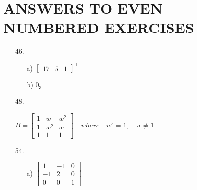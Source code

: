 \documentclass[11pt]{amsbook}
\begin{document}

\section*{ANSWERS TO EVEN NUMBERED EXERCISES}

\begin{enumerate}
 
    \item[46.]
    
        \begin{multicols}{2}
            \begin{enumerate}
            
                \item[a)]
                    $
		      \begin{bmatrix}
		      17 & 5 & 1
		      \end{bmatrix}
		      ^\intercal
                    $

                \item[b)]
		    $ 0_{3} $

            \end{enumerate}
        \end{multicols}
    

    \item[48.]
        
        $
	  B=
	  \begin{bmatrix}
	    1  &    w    &  w^{2}   \\
	    1  &  w^{2}  &    w     \\
	    1  &    1    &    1
	  \end{bmatrix}
	  \quad where \quad w^{3} = 1 , \quad w \neq 1.
        $
    

    \item[54.]
    
        \begin{multicols}{2}
            \begin{enumerate}
            
                \item[a)]
                    $
		      \begin{bmatrix}
			1  &  -1  &  0   \\
		       -1  &   2  &  0   \\
			0  &   0  &  1
		      \end{bmatrix}
                    $


\end{enumerate}
\end{multicols}
\end{enumerate}
\end{document}
